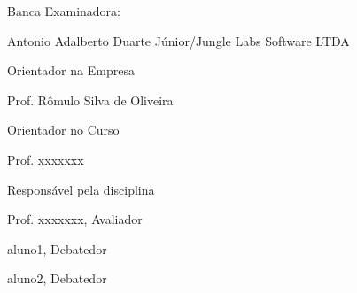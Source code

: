 
%
% 
%
\begin{folhadeaprovacao}


\thispagestyle{empty}

{\large Banca Examinadora:}

\vspace{1.3cm}

\begin{flushright}

{\large Antonio Adalberto Duarte Júnior/Jungle Labs Software LTDA}

{\large Orientador na Empresa}

\vspace{1.2cm}
{\large Prof. Rômulo Silva de Oliveira}

{\large Orientador no Curso}

\vspace{1.2cm}
 
{\large Prof. xxxxxxx}

{\large Responsável pela disciplina}

\vspace{1cm}

{\large Prof. xxxxxxx, Avaliador}

\vspace{0.8cm}

{\large aluno1, Debatedor}

\vspace{0.8cm}

{\large aluno2, Debatedor}

\end{flushright}
  
\end{folhadeaprovacao}